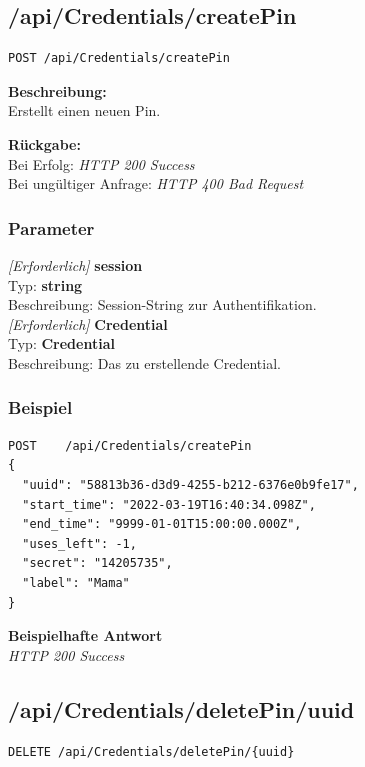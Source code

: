 \subsection{/api/Credentials/createPin}
\begin{lstlisting}
POST /api/Credentials/createPin
\end{lstlisting}

\textbf{Beschreibung:} \\
Erstellt einen neuen Pin.

\textbf{Rückgabe:} \\
Bei Erfolg: \textit{HTTP 200 Success} \\
Bei ungültiger Anfrage: \textit{HTTP 400 Bad Request}

\subsubsection{Parameter}
\textit{[Erforderlich]} \textbf{session} \\
Typ: \textbf{string} \\
Beschreibung: Session-String zur Authentifikation. \\


\textit{[Erforderlich]} \textbf{Credential} \\
Typ: \textbf{Credential} \\
Beschreibung: Das zu erstellende Credential. \\


\subsubsection{Beispiel}
\begin{lstlisting}
POST    /api/Credentials/createPin
{
  "uuid": "58813b36-d3d9-4255-b212-6376e0b9fe17",
  "start_time": "2022-03-19T16:40:34.098Z",
  "end_time": "9999-01-01T15:00:00.000Z",
  "uses_left": -1,
  "secret": "14205735",
  "label": "Mama"
}
\end{lstlisting}
\textbf{Beispielhafte Antwort} \\
\textit{HTTP 200 Success}




\subsection{/api/Credentials/deletePin/{uuid}}
\begin{lstlisting}
DELETE /api/Credentials/deletePin/{uuid}
\end{lstlisting}


